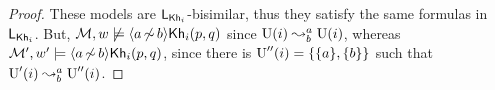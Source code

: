 \begin{textonuevo}
\begin{proof}
These models are $\KHilogic$-bisimilar, thus they satisfy the same formulas in $\KHilogic$. But, $\modults,w \not\models \refdiam{a}{b}\khi(p,q)$ since $\splitstr{\Unc(i)}{\Unc(i)}{a}{b}$, %
whereas $\modults',w' \models \refdiam{a}{b}\khi(p,q)$, since there is $\Unc''(i)=\set{\set{a},\set{b}}$ such that $\splitstr{\Unc'(i)}{\Unc''(i)}{a}{b}$.
%
%
%
%

\end{proof}
\end{textonuevo}
